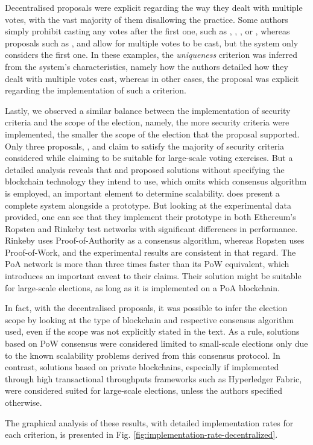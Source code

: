 \documentclass[../access.tex]{subfiles}
\begin{document}
\par
Decentralised proposals were explicit regarding the way they dealt with multiple votes, with the vast majority of them disallowing the practice. Some authors simply prohibit casting any votes after the first one, such as \cite{Vo-Cao-Thuy2019}, \cite{Bosri2019}, \cite{Singh2019}, \cite{Vivek2020} or \cite{Vidwans2022}, whereas proposals such as \cite{Lai2018}, \cite{Takabatake2021} and \cite{Liu2017} allow for multiple votes to be cast, but the system only considers the first one. In these examples, the \textit{uniqueness} criterion was inferred from the system's characteristics, namely how the authors detailed how they dealt with multiple votes cast, whereas in other cases, the proposal was explicit regarding the implementation of such a criterion.
\par
Lastly, we observed a similar balance between the implementation of security criteria and the scope of the election, namely, the more security criteria were implemented, the smaller the scope of the election that the proposal supported. Only three proposals, \cite{Zaghloul2020}, \cite{Zhang2020} and \cite{Hu2022} claim to satisfy the majority of security criteria considered while claiming to be suitable for large-scale voting exercises. But a detailed analysis reveals that \cite{Zaghloul2020} and \cite{Zhang2020} proposed solutions without specifying the blockchain technology they intend to use, which omits which consensus algorithm is employed, an important element to determine scalability. \cite{Hu2022} does present a complete system alongside a prototype. But looking at the experimental data provided, one can see that they implement their prototype in both Ethereum's Ropsten and Rinkeby test networks with significant differences in performance. Rinkeby uses Proof-of-Authority as a consensus algorithm, whereas Ropsten uses Proof-of-Work, and the experimental results are consistent in that regard. The PoA network is more than three times faster than its PoW equivalent, which introduces an important caveat to their claims. Their solution might be suitable for large-scale elections, as long as it is implemented on a PoA blockchain.
\par
In fact, with the decentralised proposals, it was possible to infer the election scope by looking at the type of blockchain and respective consensus algorithm used, even if the scope was not explicitly stated in the text. As a rule, solutions based on PoW consensus were considered limited to small-scale elections only due to the known scalability problems derived from this consensus protocol. In contrast, solutions based on private blockchains, especially if implemented through high transactional throughputs frameworks such as Hyperledger Fabric, were considered suited for large-scale elections, unless the authors specified otherwise.
\par
The graphical analysis of these results, with detailed implementation rates for each criterion, is presented in Fig. \ref{fig:implementation-rate-decentralized}.
\end{document}
